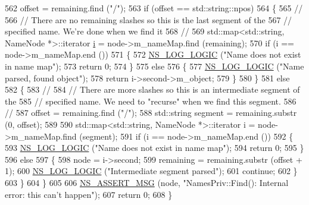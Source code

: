 \begin{DoxyCode}
562       offset = remaining.find (\textcolor{stringliteral}{"/"});
563       \textcolor{keywordflow}{if} (offset == std::string::npos)
564         \{
565           \textcolor{comment}{//}
566           \textcolor{comment}{// There are no remaining slashes so this is the last segment of the }
567           \textcolor{comment}{// specified name.  We're done when we find it}
568           \textcolor{comment}{//}
569           std::map<std::string, NameNode *>::iterator \hyperlink{bernuolliDistribution_8m_a6f6ccfcf58b31cb6412107d9d5281426}{i} = node->m\_nameMap.find (remaining);
570           \textcolor{keywordflow}{if} (i == node->m\_nameMap.end ())
571             \{
572               \hyperlink{group__logging_ga88acd260151caf2db9c0fc84997f45ce}{NS\_LOG\_LOGIC} (\textcolor{stringliteral}{"Name does not exist in name map"});
573               \textcolor{keywordflow}{return} 0;
574             \}
575           \textcolor{keywordflow}{else}
576             \{
577               \hyperlink{group__logging_ga88acd260151caf2db9c0fc84997f45ce}{NS\_LOG\_LOGIC} (\textcolor{stringliteral}{"Name parsed, found object"});
578               \textcolor{keywordflow}{return} i->second->m\_object;
579             \}
580         \}
581       \textcolor{keywordflow}{else}
582         \{
583           \textcolor{comment}{//}
584           \textcolor{comment}{// There are more slashes so this is an intermediate segment of the }
585           \textcolor{comment}{// specified name.  We need to "recurse" when we find this segment.}
586           \textcolor{comment}{//}
587           offset = remaining.find (\textcolor{stringliteral}{"/"});
588           std::string segment = remaining.substr (0, offset);
589 
590           std::map<std::string, NameNode *>::iterator i = node->m\_nameMap.find (segment);
591           \textcolor{keywordflow}{if} (i == node->m\_nameMap.end ())
592             \{
593               \hyperlink{group__logging_ga88acd260151caf2db9c0fc84997f45ce}{NS\_LOG\_LOGIC} (\textcolor{stringliteral}{"Name does not exist in name map"});
594               \textcolor{keywordflow}{return} 0;
595             \}
596           \textcolor{keywordflow}{else}
597             \{
598               node = i->second;
599               remaining = remaining.substr (offset + 1);
600               \hyperlink{group__logging_ga88acd260151caf2db9c0fc84997f45ce}{NS\_LOG\_LOGIC} (\textcolor{stringliteral}{"Intermediate segment parsed"});
601               \textcolor{keywordflow}{continue};
602             \}
603         \}
604     \}
605 
606   \hyperlink{assert_8h_aff5ece9066c74e681e74999856f08539}{NS\_ASSERT\_MSG} (node, \textcolor{stringliteral}{"NamesPriv::Find(): Internal error:  this can't happen"});
607   \textcolor{keywordflow}{return} 0;
608 \}
\end{DoxyCode}


